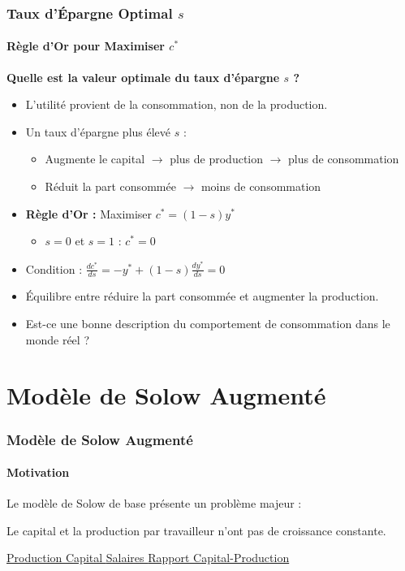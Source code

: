 \documentclass{beamer}
\begin{document}
\begin{frame}
    \frametitle{Taux d'Épargne Optimal \( s \)}
    \framesubtitle{Règle d'Or pour Maximiser \( c^* \)}

    \textbf{Quelle est la valeur optimale du taux d'épargne \( s \) ?}
    \begin{itemize}
        \item L'utilité provient de la consommation, non de la production.
        \item Un taux d'épargne plus élevé \( s \) :
            \begin{itemize}
                \item Augmente le capital \(\rightarrow\) plus de production \(\rightarrow\) plus de consommation
                \item Réduit la part consommée \(\rightarrow\) moins de consommation
            \end{itemize}
        \item \textbf{Règle d'Or :} Maximiser \( c^* = (1-s)y^* \)
            \begin{itemize}
                \item \( s = 0 \) et \( s = 1 \) : \( c^* = 0 \)
            \end{itemize}
        \item Condition : \(\frac{dc^*}{ds} = -y^* + (1-s)\frac{dy^*}{ds} = 0\)
        \item Équilibre entre réduire la part consommée et augmenter la production.
        \item Est-ce une bonne description du comportement de consommation dans le monde réel ?
    \end{itemize}
\end{frame}



\section{Modèle de Solow Augmenté}

\begin{frame}
    \frametitle{Modèle de Solow Augmenté}
    \framesubtitle{Motivation}
    Le modèle de Solow de base présente un problème majeur :

    Le capital et la production par travailleur n'ont pas de croissance constante.
    
    \hyperlink{growth}{Production }
    \hyperlink{capital}{Capital }
    \hyperlink{wages}{Salaires }
    \hyperlink{capital_output_ratio}{Rapport Capital-Production}
    \pause

\end{frame}
\end{document}
